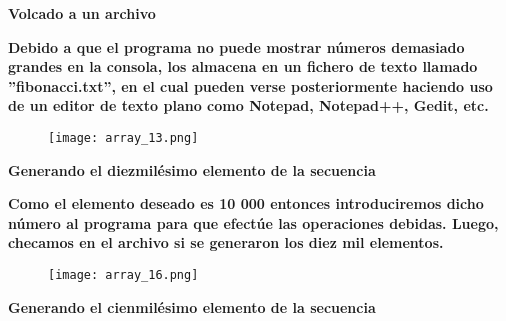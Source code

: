 \documentclass[letterpaper]{article}
\begin{document}
\begin{center}
\textbf{\LARGE Volcado a un archivo\\}
\vspace{0.5cm}
\end{center}

\begin{flushleft}
\textbf{\Large Debido a que el programa no puede mostrar n\'umeros demasiado grandes en la consola, los almacena en un fichero de texto llamado ''fibonacci.txt'', en el cual pueden verse posteriormente haciendo uso de un editor de texto plano como Notepad, Notepad++, Gedit, etc.\\}
\vspace{0.5cm}

\end{flushleft}
\begin{center}
\begin{figure}[H] %
\texttt{[image: array\_13.png]}
\end{figure}
\end{center}

\clearpage

\begin{center}
\textbf{\LARGE Generando el diezmil\'esimo elemento de la secuencia\\}
\vspace{0.5cm}
\end{center}

\begin{flushleft}
\textbf{\Large Como el elemento deseado es 10 000 entonces introduciremos dicho n\'umero al programa para que efect\'ue las operaciones debidas. Luego, checamos en el archivo si se generaron los diez mil elementos.\\}

\end{flushleft}
\begin{center}
\begin{figure}[H] %
\texttt{[image: array\_16.png]}
\end{figure}
\end{center}

\vspace{-1.0cm}

\begin{center}
\textbf{\LARGE Generando el cienmil\'esimo elemento de la secuencia\\}
\vspace{0.5cm}
\end{center}
\end{document}
